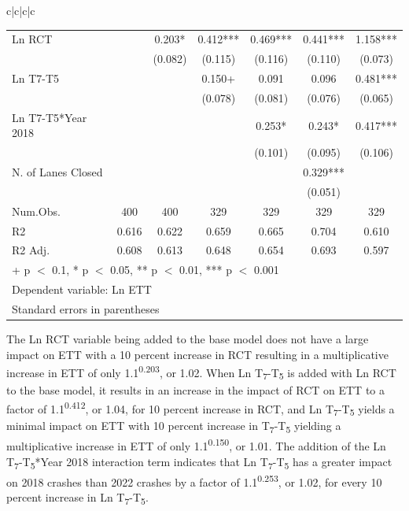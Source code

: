 \documentclass[
  letterpaper,
  authoryear]{elsarticle}
\begin{document}
\begin{table}
{\begin{tabular}[t]{c|c|c|c}
\begin{table}
\begin{table}
{\begin{tabular}[t]{lcccccc}
Ln RCT &  & 0.203* & 0.412*** & 0.469*** & 0.441*** & 1.158***\\
 &  & (0.082) & (0.115) & (0.116) & (0.110) & (0.073)\\
Ln T7-T5 &  &  & 0.150+ & 0.091 & 0.096 & 0.481***\\
 &  &  & (0.078) & (0.081) & (0.076) & (0.065)\\
Ln T7-T5*Year 2018 &  &  &  & 0.253* & 0.243* & 0.417***\\
 &  &  &  & (0.101) & (0.095) & (0.106)\\
N. of Lanes Closed &  &  &  &  & 0.329*** & \\
 &  &  &  &  & (0.051) & \\
\midrule
Num.Obs. & 400 & 400 & 329 & 329 & 329 & 329\\
R2 & 0.616 & 0.622 & 0.659 & 0.665 & 0.704 & 0.610\\
R2 Adj. & 0.608 & 0.613 & 0.648 & 0.654 & 0.693 & 0.597\\
\bottomrule
\multicolumn{7}{l}{\rule{0pt}{1em}+ p $<$ 0.1, * p $<$ 0.05, ** p $<$ 0.01, *** p $<$ 0.001}\\
\multicolumn{7}{l}{\rule{0pt}{1em}Dependent variable: Ln ETT}\\
\multicolumn{7}{l}{\rule{0pt}{1em}Standard errors in parentheses}\\
\end{tabular}

}

\end{table}%

The Ln RCT variable being added to the base model does not have a large
impact on ETT with a 10 percent increase in RCT resulting in a
multiplicative increase in ETT of only 1.1\textsuperscript{0.203}, or
1.02. When Ln T\textsubscript{7}-T\textsubscript{5} is added with Ln RCT
to the base model, it results in an increase in the impact of RCT on ETT
to a factor of 1.1\textsuperscript{0.412}, or 1.04, for 10 percent
increase in RCT, and Ln T\textsubscript{7}-T\textsubscript{5} yields a
minimal impact on ETT with 10 percent increase in
T\textsubscript{7}-T\textsubscript{5} yielding a multiplicative increase
in ETT of only 1.1\textsuperscript{0.150}, or 1.01. The addition of the
Ln T\textsubscript{7}-T\textsubscript{5}*Year 2018 interaction term
indicates that Ln T\textsubscript{7}-T\textsubscript{5} has a greater
impact on 2018 crashes than 2022 crashes by a factor of
1.1\textsuperscript{0.253}, or 1.02, for every 10 percent increase in Ln
T\textsubscript{7}-T\textsubscript{5}.


\end{table}
\end{tabular}}
\end{table}
\end{document}
